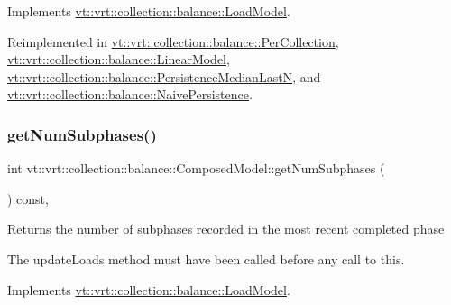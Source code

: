 Implements \hyperlink{structvt_1_1vrt_1_1collection_1_1balance_1_1_load_model_a44905eb3e15e7f22b2f8d1fe7297cea0}{vt\+::vrt\+::collection\+::balance\+::\+Load\+Model}.



Reimplemented in \hyperlink{structvt_1_1vrt_1_1collection_1_1balance_1_1_per_collection_ad71f5405a169c5fe2a25668df96c3a7c}{vt\+::vrt\+::collection\+::balance\+::\+Per\+Collection}, \hyperlink{structvt_1_1vrt_1_1collection_1_1balance_1_1_linear_model_ae1a9d609a834df8d672992de8184e458}{vt\+::vrt\+::collection\+::balance\+::\+Linear\+Model}, \hyperlink{structvt_1_1vrt_1_1collection_1_1balance_1_1_persistence_median_last_n_a4f65801b9a93bfbc24e98b8ff1e111bc}{vt\+::vrt\+::collection\+::balance\+::\+Persistence\+Median\+LastN}, and \hyperlink{structvt_1_1vrt_1_1collection_1_1balance_1_1_naive_persistence_a2842669870cdef1ab7d5f63d23951f69}{vt\+::vrt\+::collection\+::balance\+::\+Naive\+Persistence}.

\mbox{\label{classvt_1_1vrt_1_1collection_1_1balance_1_1_composed_model_a744a16572614d11e554b1bf53b7c57f6}} 
\subsubsection{\texorpdfstring{get\+Num\+Subphases()}{getNumSubphases()}}
{\footnotesize\ttfamily int vt\+::vrt\+::collection\+::balance\+::\+Composed\+Model\+::get\+Num\+Subphases (\begin{DoxyParamCaption}{ }\end{DoxyParamCaption}) const\hspace{0.3cm}{\ttfamily [override]}, {\ttfamily [virtual]}}

Returns the number of subphases recorded in the most recent completed phase

The {\ttfamily update\+Loads} method must have been called before any call to this. 

Implements \hyperlink{structvt_1_1vrt_1_1collection_1_1balance_1_1_load_model_aa7ddeca4fc8de99bc25a895e207de2e6}{vt\+::vrt\+::collection\+::balance\+::\+Load\+Model}.



